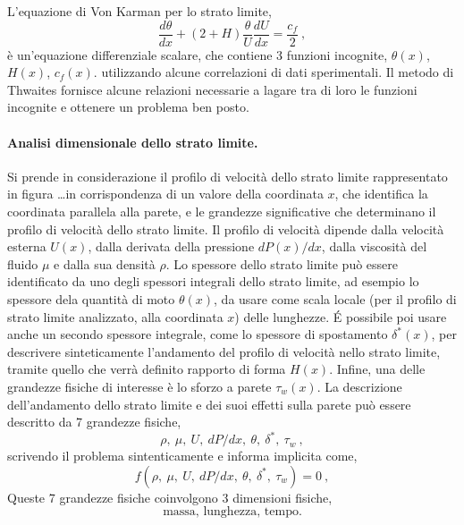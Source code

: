 L'equazione di Von Karman per lo strato limite,
\begin{equation}\label{eqn:vkie}
\dfrac{d \theta}{dx} + \left( 2 + H \right) \dfrac{\theta}{U} \dfrac{d U}{dx} = \dfrac{c_f}{2} \ ,
\end{equation}
è un'equazione differenziale scalare, che contiene 3 funzioni incognite, $\theta(x)$, $H(x)$, $c_f(x)$.
utilizzando alcune correlazioni di dati sperimentali. Il metodo di Thwaites fornisce alcune relazioni necessarie a lagare tra di loro le funzioni incognite e ottenere un problema ben posto.

\paragraph{Analisi dimensionale dello strato limite.}
Si prende in considerazione il profilo di velocità dello strato limite rappresentato in figura \dots in corrispondenza di un valore della coordinata $x$, che identifica la coordinata parallela alla parete, e le grandezze significative che determinano il profilo di velocità dello strato limite. Il profilo di velocità dipende dalla velocità esterna $U(x)$, dalla derivata della pressione $dP(x)/dx$, dalla viscosità del fluido $\mu$ e dalla sua densità $\rho$. Lo spessore dello strato limite può essere identificato da uno degli spessori integrali dello strato limite, ad esempio lo spessore dela quantità di moto $\theta(x)$, da usare come scala locale (per il profilo di strato limite analizzato, alla coordinata $x$) delle lunghezze. \'E possibile poi usare anche un secondo spessore integrale, come lo spessore di spostamento $\delta^*(x)$, per descrivere sinteticamente l'andamento del profilo di velocità nello strato limite, tramite quello che verrà definito rapporto di forma $H(x)$. Infine, una delle grandezze fisiche di interesse è lo sforzo a parete $\tau_w(x)$. La descrizione dell'andamento dello strato limite e dei suoi effetti sulla parete può essere descritto da 7 grandezze fisiche,
\begin{equation}
  \rho, \  \mu, \ U, \ dP/dx, \ \theta, \ \delta^*, \ \tau_w \ ,
\end{equation}
scrivendo il problema sintenticamente e informa implicita come,
\begin{equation}
 f( \rho, \  \mu, \ U, \ dP/dx, \ \theta, \ \delta^*, \ \tau_w ) = 0 \ ,
\end{equation}
%
Queste 7 grandezze fisiche coinvolgono 3 dimensioni fisiche,
\begin{equation}
 \text{massa, lunghezza, tempo.}
\end{equation}
